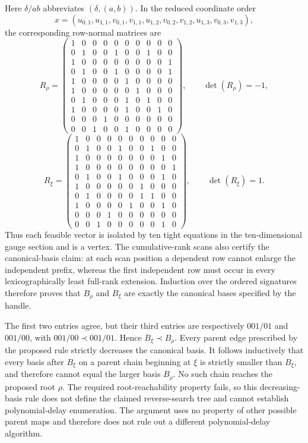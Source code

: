 Here \(\delta/ab\) abbreviates \((\delta,(a,b))\). In the reduced coordinate order
\[x=(u_{0,1},u_{1,1},v_{0,1},v_{1,1},u_{1,2},v_{0,2},v_{1,2},u_{1,3},v_{0,3},v_{1,3}),\]
the corresponding row-normal matrices are
\[R_\rho=\begin{pmatrix}1&0&0&0&0&0&0&0&0&0\\ 0&1&0&0&1&0&0&1&0&0\\ 1&0&0&0&0&0&0&0&0&1\\ 0&1&0&0&1&0&0&0&0&1\\ 1&0&0&0&0&1&0&0&0&0\\ 1&0&0&0&0&0&1&0&0&0\\ 0&1&0&0&0&1&0&1&0&0\\ 1&0&0&0&0&1&0&0&1&0\\ 0&0&0&1&0&0&0&0&0&0\\ 0&0&1&0&0&1&0&0&0&0\end{pmatrix},\qquad\det(R_\rho)=-1,\]
\[R_\xi=\begin{pmatrix}1&0&0&0&0&0&0&0&0&0\\ 0&1&0&0&1&0&0&1&0&0\\ 1&0&0&0&0&0&0&0&1&0\\ 1&0&0&0&0&0&0&0&0&1\\ 0&1&0&0&1&0&0&0&1&0\\ 1&0&0&0&0&0&1&0&0&0\\ 0&1&0&0&0&0&1&1&0&0\\ 1&0&0&0&0&1&0&0&1&0\\ 0&0&0&1&0&0&0&0&0&0\\ 0&0&1&0&0&0&0&0&1&0\end{pmatrix},\qquad\det(R_\xi)=1.\]
Thus each feasible vector is isolated by ten tight equations in the ten-dimensional gauge section and is a vertex. The cumulative-rank scans also certify the canonical-basis claim: at each scan position a dependent row cannot enlarge the independent prefix, whereas the first independent row must occur in every lexicographically least full-rank extension. Induction over the ordered signatures therefore proves that \(B_\rho\) and \(B_\xi\) are exactly the canonical bases specified by the handle.

The first two entries agree, but their third entries are respectively \(001/01\) and \(001/00\), with \(001/00\prec001/01\). Hence \(B_\xi\prec B_\rho\). Every parent edge prescribed by the proposed rule strictly decreases the canonical basis. It follows inductively that every basis after \(B_\xi\) on a parent chain beginning at \(\xi\) is strictly smaller than \(B_\xi\), and therefore cannot equal the larger basis \(B_\rho\). No such chain reaches the proposed root \(\rho\). The required root-reachability property fails, so this decreasing-basis rule does not define the claimed reverse-search tree and cannot establish polynomial-delay enumeration. The argument uses no property of other possible parent maps and therefore does not rule out a different polynomial-delay algorithm.